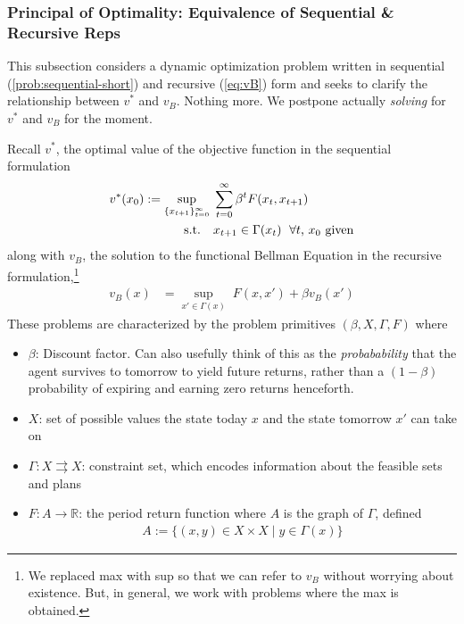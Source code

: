 \documentclass[12pt]{book}
\numberwithin{equation}{section} %
\theoremstyle{plain}
\theoremstyle{definition}
\theoremstyle{remark}
\newcommand{\ra}{\rightarrow}
\newcommand{\R}{\mathbb{R}}
\newcommand{\sumtinfz}{\sum^\infty_{t=0}}
\begin{document}
\clearpage
\subsubsection{Principal of Optimality: Equivalence of Sequential \&
Recursive Reps}

This subsection considers a dynamic optimization problem written in
sequential (\ref{prob:sequential-short}) and recursive (\ref{eq:vB}) form
and seeks to clarify the relationship between $v^*$ and $v_B$.
Nothing more. We postpone actually \emph{solving} for $v^*$ and $v_B$
for the moment.

Recall $v^*$, the optimal value of the objective function in the
sequential formulation
\begin{align}
  \label{eq:vstar}
  v^*(x_0) := \sup_{\{x_{t+1}\}_{t=0}^\infty}
  \; &\sumtinfz \beta^t F(x_t,x_{t+1})
  \\
  \qquad \text{s.t.}\quad
  &
  \text{$x_{t+1} \in \Gamma(x_t)$ $\;\forall t$, $x_0$ given}
  \notag
\end{align}
along with $v_B$, the solution to the functional Bellman Equation
in the recursive formulation,\footnote{%
  We replaced max with sup so that we can refer to $v_B$ without
  worrying about existence. But, in general, we work with problems where
  the max is obtained.
}
\begin{align}
  \label{eq:vB2}
  v_B(x) &=
  \sup_{x'\in\Gamma(x)}\;
  F(x,x') +
  \beta v_B(x')
\end{align}
These problems are characterized by the problem primitives
$(\beta,X,\Gamma,F)$ where
\begin{itemize}
  \item $\beta$: Discount factor. Can also usefully think of this as
    the \emph{probabability} that the agent survives to tomorrow to
    yield future returns, rather than a $(1-\beta)$ probability of
    expiring and earning zero returns henceforth.
  \item $X$: set of possible values the state today $x$ and the
    state tomorrow $x'$ can take on
  \item $\Gamma:X \rightrightarrows X$: constraint set, which encodes
    information about the feasible sets and plans
  \item $F:A\ra \R$: the period return function where $A$ is the
    graph of $\Gamma$, defined
    \begin{align*}
      A:=\{(x,y) \in X\times X \;|\; y \in\Gamma(x)\}
    \end{align*}
\end{itemize}
\end{document}
